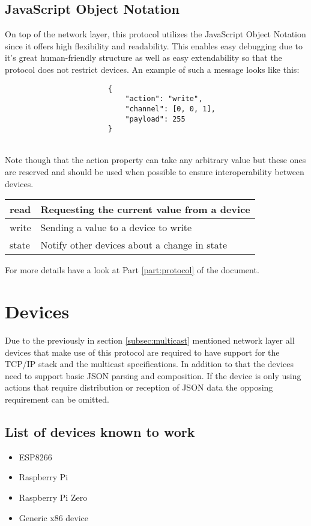 \documentclass[11pt,a4paper, titlepage]{article}
\begin{document}
			\subsection[JSON]{JavaScript Object Notation}
				On top of the network layer, this protocol utilizes the JavaScript Object Notation since it offers high flexibility and readability. This enables easy debugging due to it's great human-friendly structure as well as easy extendability so that the protocol does not restrict devices. An example of such a message looks like this:
				\begin{listing}
					\begin{verbatim}
						{
							"action": "write",
							"channel": [0, 0, 1],
							"payload": 255
						}
					\end{verbatim}
					\caption{Simplest write request}
					\label{SimplestJSON}
				\end{listing}
				\\
				Note though that the action property can take any arbitrary value but these ones are reserved and should be used when possible to ensure interoperability between devices.
				\begin{center}
					\def\arraystretch{2}
					\begin{tabular}{ l | l }	
						read & Requesting the current value from a device \\
						\hline
						write & Sending a value to a device to write \\
						\hline
						state & Notify other devices about a change in state
					\end{tabular}
				\end{center}
				For more details have a look at Part \ref{part:protocol} of the document.
		
		\section{Devices}
			Due to the previously in section \ref{subsec:multicast} mentioned network layer all devices that make use of this protocol are required to have support for the TCP/IP stack and the multicast specifications. In addition to that the devices need to support basic JSON parsing and composition. If the device is only using actions that require distribution or reception of JSON data the opposing requirement can be omitted.
			\subsection[Examples]{List of devices known to work}
				\begin{itemize}
					\item ESP8266
					\item Raspberry Pi
					\item Raspberry Pi Zero
					\item Generic x86 device
				\end{itemize}
			
\end{document}
